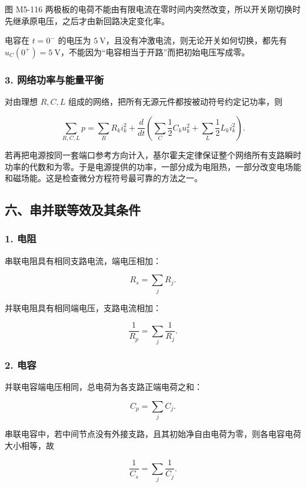 图 M5-116
两极板的电荷不能由有限电流在零时间内突然改变，所以开关刚切换时先继承原电压，之后才由新回路决定变化率。

电容在 \(t=0^-\) 的电压为
\(5\ \mathrm V\)，且没有冲激电流，则无论开关如何切换，都先有
\(u_C(0^+)=5\ \mathrm V\)，不能因为``电容相当于开路''而把初始电压写成零。

\subsubsection{3.
网络功率与能量平衡}\label{m5:ux7f51ux7edcux529fux7387ux4e0eux80fdux91cfux5e73ux8861}

对由理想 \(R,C,L\) 组成的网络，把所有无源元件都按被动符号约定记功率，则

\[
\sum_{R,C,L} p
=\sum_R R_ki_k^2
+\frac d{dt}\left(
\sum_C\frac12C_ku_k^2
+\sum_L\frac12L_ki_k^2
\right).
\]

若再把电源按同一套端口参考方向计入，基尔霍夫定律保证整个网络所有支路瞬时功率的代数和为零。于是电源提供的功率，一部分成为电阻热，一部分改变电场能和磁场能。这是检查微分方程符号最可靠的方法之一。

\subsection{六、串并联等效及其条件}\label{m5:ux516dux4e32ux5e76ux8054ux7b49ux6548ux53caux5176ux6761ux4ef6}

\subsubsection{1. 电阻}\label{m5:ux7535ux963b}

串联电阻具有相同支路电流，端电压相加：

\[
\boxed{R_s=\sum_jR_j}.
\]

并联电阻具有相同端电压，支路电流相加：

\[
\boxed{\frac1{R_p}=\sum_j\frac1{R_j}}.
\]

\subsubsection{2. 电容}\label{m5:ux7535ux5bb9}

并联电容端电压相同，总电荷为各支路正端电荷之和：

\[
\boxed{C_p=\sum_jC_j}.
\]

串联电容中，若中间节点没有外接支路，且其初始净自由电荷为零，则各电容电荷大小相等，故

\[
\boxed{\frac1{C_s}=\sum_j\frac1{C_j}}.
\]

